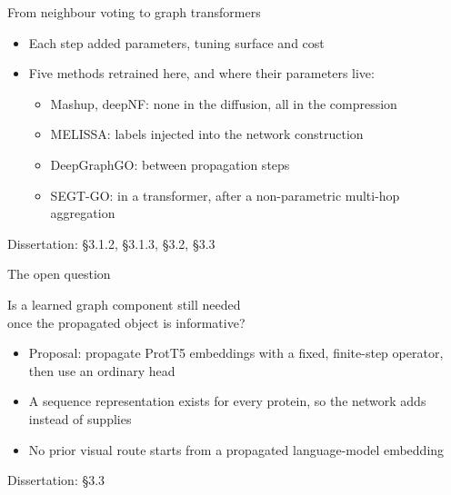 \documentclass[aspectratio=169,10pt]{beamer}
\newcommand{\src}[1]{\par\vfill\hfill{\scriptsize\color{gray}Dissertation: #1}}
\begin{document}
\begin{frame}{From neighbour voting to graph transformers}
  \begin{center}
  \end{center}
  \begin{itemize}
    \item Each step added parameters, tuning surface and cost
    \item Five methods retrained here, and where their parameters live:
    \begin{itemize}
      \item Mashup, deepNF: none in the diffusion, all in the compression
      \item MELISSA: labels injected into the network construction
      \item DeepGraphGO: between propagation steps
      \item SEGT-GO: in a transformer, after a non-parametric multi-hop aggregation
    \end{itemize}
  \end{itemize}
  \src{§3.1.2, §3.1.3, §3.2, §3.3}
\end{frame}

\begin{frame}{The open question}
  \begin{block}{}
    \centering\large Is a learned graph component still needed\\once the propagated object is informative?
  \end{block}
  \vspace{0.5em}
  \begin{itemize}[<+(1)->]
    \item Proposal: propagate ProtT5 embeddings with a fixed, finite-step operator, then use an ordinary head
    \item A sequence representation exists for every protein, so the network adds instead of supplies
    \item No prior visual route starts from a propagated language-model embedding
  \end{itemize}
  \src{§3.3}
\end{frame}
\end{document}
